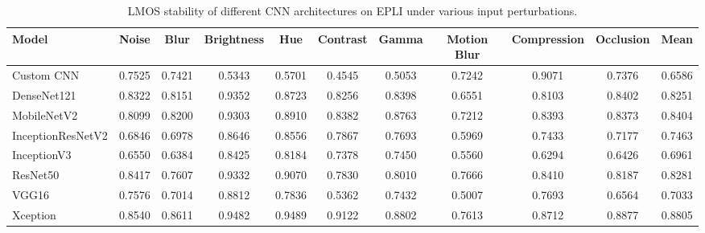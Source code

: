 \documentclass[a4paper,fleqn]{cas-dc}
\begin{document}
\begin{table}[t]
\centering
\caption{LMOS stability of different CNN architectures on EPLI under various input perturbations.}
\label{tab:lmos_stability_egypli}

\scriptsize
\setlength{\tabcolsep}{3pt}
\renewcommand{\arraystretch}{1.1}

\begin{tabular}{|l|ccccccccc|c|}
\hline
\textbf{Model} &
\textbf{Noise} &
\textbf{Blur} &
\textbf{Brightness} &
\textbf{Hue} &
\textbf{Contrast} &
\textbf{Gamma} &
\textbf{Motion Blur} &
\textbf{Compression} &
\textbf{Occlusion} &
\textbf{Mean}\\
\hline

Custom CNN
&0.7525&0.7421&0.5343&0.5701&0.4545&0.5053&0.7242&0.9071&0.7376&0.6586\\

DenseNet121
&0.8322&0.8151&0.9352&0.8723&0.8256&0.8398&0.6551&0.8103&0.8402&0.8251\\

MobileNetV2
&0.8099&0.8200&0.9303&0.8910&0.8382&0.8763&0.7212&0.8393&0.8373&0.8404\\

InceptionResNetV2
&0.6846&0.6978&0.8646&0.8556&0.7867&0.7693&0.5969&0.7433&0.7177&0.7463\\

InceptionV3
&0.6550&0.6384&0.8425&0.8184&0.7378&0.7450&0.5560&0.6294&0.6426&0.6961\\

ResNet50
&0.8417&0.7607&0.9332&0.9070&0.7830&0.8010&0.7666&0.8410&0.8187&0.8281\\

VGG16
&0.7576&0.7014&0.8812&0.7836&0.5362&0.7432&0.5007&0.7693&0.6564&0.7033\\

Xception
&0.8540&0.8611&0.9482&0.9489&0.9122&0.8802&0.7613&0.8712&0.8877&0.8805\\


\hline
\end{tabular}
\end{table}
\end{document}

